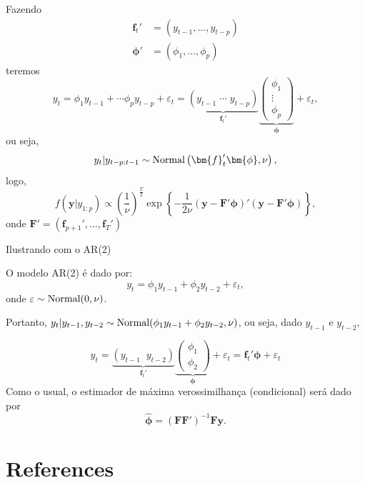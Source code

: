 \documentclass[
  letterpaper,
  DIV=11,
  numbers=noendperiod]{scrreprt}
\newlength{\cslhangindent}
\newlength{\cslentryspacingunit} %
\newenvironment{CSLReferences}[2] %
 {%
  \setlength{\parindent}{0pt}
  \ifodd #1
  \let\oldpar\par
  \def\par{\hangindent=\cslhangindent\oldpar}
  \fi
  \setlength{\parskip}{#2\cslentryspacingunit}
 }%
 {}
\theoremstyle{definition}
\theoremstyle{plain}
\theoremstyle{definition}
\theoremstyle{plain}
\theoremstyle{remark}
\begin{document}
\begin{frame}
    Fazendo
    \begin{align}
    \bm{f}_t'&=\left(y_{t-1},\ldots,y_{t-p}\right)\\
    \bm{\phi}'&=\left(\phi_{1},\ldots,\phi_{p}\right)       
    \end{align}
    teremos
    $$y_t=\phi_1y_{t-1}+\cdots \phi_p y_{t-p} +\varepsilon_t= \underbrace{(y_{t-1}\;\cdots\;y_{t-p})}_{\bm{f}_t'}\underbrace{\left(\begin{array}{c}\phi_1 \\ \vdots \\ \phi_p\end{array}\right)}_{\bm{\phi}} + \varepsilon_{t},$$
    ou seja,
    $$y_t|y_{t-p:t-1}\sim\hbox{Normal}\left(\bm{f}_t'\bm{\phi}, \nu\right),$$
    logo,
    $$f(\bm{y}|y_{1:p})\propto \left(\frac{1}{\nu}\right)^{\frac{T}{2}}\exp\left\{ -\frac{1}{2\nu}\left(\bm{y}-\bm{F}'\bm{\phi}\right)'\left(\bm{y}-\bm{F}'\bm{\phi}\right) \right\},$$
    onde $\bm{F}'=\left(\bm{f}_{p+1}',\ldots,\bm{f}_{T}'\right)$
\end{frame}

\begin{frame}{Ilustrando com o AR(2)}
    
    O modelo AR(2) é dado por:
    $$y_t = \phi_1 y_{t-1}+\phi_2 y_{t-2} + \varepsilon_t,$$
        onde $\varepsilon\sim\hbox{Normal}(0,\nu)$.
    
    Portanto, $y_t|y_{t-1},y_{t-2}\sim\hbox{Normal}( \phi_1 y_{t-1} + \phi_2 y_{t-2}, \nu)$, ou seja, dado $y_{t-1}$ e $y_{t-2}$, 
    
    $$ y_t = \underbrace{ \left(  y_{t-1} \;\; y_{t-2}   \right) }_\text{$\bm{f}_t'$}\underbrace{\left(\begin{array}{c}\phi_1 \\ \phi_2
        \end{array}\right)}_\text{$\bm{\phi}$}+\varepsilon_t= \bm{f}_t'\bm{\phi}+\varepsilon_t$$
    Como o usual, o estimador de máxima verossimilhança (condicional) será dado por
    $$\bm{\hat{\phi}}=(\bm{F}\bm{F}')^{-1}\bm{F}\bm{y}.$$
    
    
    
\end{frame}


\hypertarget{references}{%
\chapter*{References}\label{references}}


\hypertarget{refs}{}
\begin{CSLReferences}{0}{0}
\end{CSLReferences}
\end{document}
